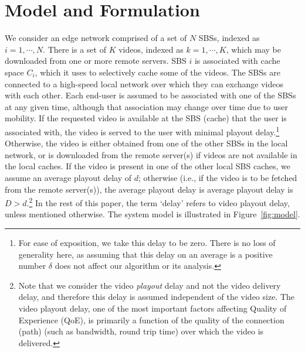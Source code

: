 \documentclass[conference]{IEEEtran}
\begin{document}
\section{Model and Formulation}
\label{sec:model}
We consider an edge network comprised of a set of $N$ SBSs, indexed as $i=1, \cdots, N$. There is a set of $K$ videos, indexed as $k=1, \cdots, K$, which may be downloaded from one or more remote servers. 
SBS $i$ is associated with cache space $C_i$, which it uses to selectively cache some of the videos. The SBSs are connected to a high-speed local network over which they can exchange videos with each other. Each end-user is assumed to be associated with one of the SBSs at any given time, although that association may change over time due to user mobility. If the requested video is available at the SBS (cache) that the user is associated with, the video is served to the user with minimal playout delay.\footnote{For ease of exposition, we take this delay to be zero. There is no loss of generality here, as assuming that this delay on an average is a positive number $\delta$ does not affect our algorithm or its analysis.} Otherwise, the video is either obtained from one of the other SBSs in the local network, or is downloaded from the remote server(s) if videos are not available in the local caches. If the video is present in one of the other local SBS caches, we assume an average playout delay of $d$; otherwise (i.e., if the video is to be fetched from the remote server(s)), the average playout delay is average playout delay is $D > d$.\footnote{Note that we consider the video \textit{playout} delay and not the video delivery delay, and therefore this delay is assumed independent of the video size. The video playout delay, one of the most important factors affecting Quality of Experience (QoE), is primarily a function of the quality of the connection (path) (such as bandwidth, round trip time) over which the video is delivered.} In the rest of this paper, the term `delay' refers to video playout delay, unless mentioned otherwise. The system model is illustrated in Figure~\ref{fig:model}. 

\end{document}
